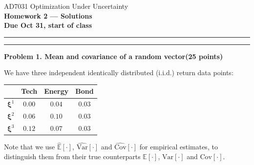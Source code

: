 \documentclass[10pt]{article}
\newcommand{\problem}[2]{%
  \par\bigskip
  {\color{ruleink}\rule{\textwidth}{1pt}}\par\nobreak\vspace{3pt}
  {\large\bfseries #2}\hfill{\normalsize\bfseries(#1 points)}\par\nobreak\vspace{4pt}}
\begin{document}
\begin{center}
  {\large AD7031 Optimization Under Uncertainty}\\[3pt]
  {\Large\bfseries Homework 2 --- Solutions}\\[4pt]
  {\small \textbf{Due Oct 31, start of class}}
\end{center}
\medskip\hrule\medskip

\problem{25}{Problem 1. Mean and covariance of a random vector}

We have three independent identically distributed (i.i.d.) return data points:

\begin{center}
\begin{tabular}{c|ccc}
           & Tech   & Energy & Bond   \\ \hline
 $\bm{\xi}^1$   & $0.00$ & $0.04$ & $0.03$ \\
 $\bm{\xi}^2$   & $0.06$ & $0.10$ & $0.03$ \\
 $\bm{\xi}^3$   & $0.12$ & $0.07$ & $0.03$ \\
\end{tabular}
\end{center}

Note that we use $\widehat{\mathbb{E}}[\cdot]$, $\widehat{\mathrm{Var}}[\cdot]$ and $\widehat{\mathrm{Cov}}[\cdot]$ for empirical
estimates, to distinguish them from their true counterparts $\mathbb{E}[\cdot]$, $\mathrm{Var}[\cdot]$ and $\mathrm{Cov}[\cdot]$.
\end{document}
